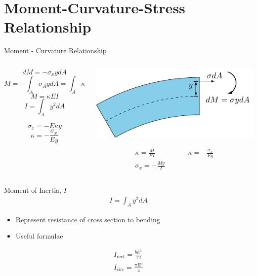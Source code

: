 \documentclass[10pt, svgnames]{beamer}
\begin{document}
\section{Moment-Curvature-Stress Relationship}
\label{moment-curvature-stress-relationship}
\begin{frame}[label={sec:org1511588}]{Moment - Curvature Relationship}
\begin{columns}
\begin{column}{0.4\columnwidth}
\[dM = - \sigma_x y dA\]
\[M = - \int_A \sigma_A y dA = \int_A \kappa E y^2 dA\]
\[M = \kappa E I\] \[I = \int_A y^2 dA\]

\[\sigma_x = - E\kappa y\] \[\kappa = - \frac{ \sigma_x }{Ey}\]
\end{column}

\begin{column}{0.6\columnwidth}
\begin{center}
\includegraphics[width=.9\linewidth]{pictures/moment-curvature.pdf}
\end{center}

\begin{gather*}
      \kappa = \frac{M}{EI} \hspace{2cm} \kappa = -\frac{\sigma_{x}}{Ey} \\
      \sigma_{x} = -\frac{My}{I}
\end{gather*}
\end{column}
\end{columns}
\end{frame}

\begin{frame}[label={sec:org177a349}]{Moment of Inertia, \(I\)}
\begin{align*}
    I = \int_{A} y^{2}dA
\end{align*}

\begin{itemize}
\item Represent resistance of cross section to bending

\item Useful formulae
\end{itemize}

\begin{align*}
  I_{\text{rect}} = \frac{bh^{3}}{12} \\
  I_{\text{circ}}= \frac{\pi R^{4}}{4}
\end{align*}
\end{frame}
\end{document}

